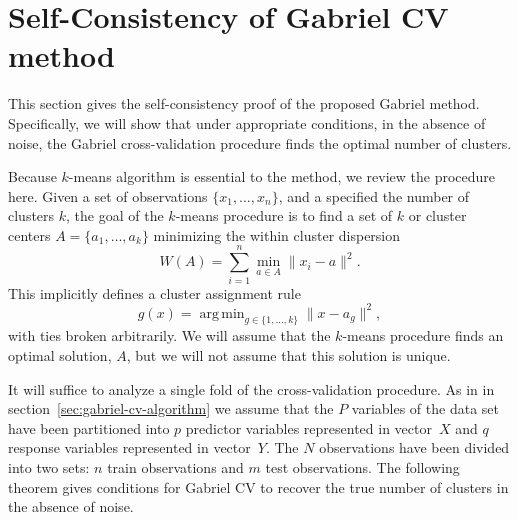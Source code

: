 \documentclass[11pt]{article}
\DeclareMathOperator*{\argmin}{arg\,min}
\begin{document}
\section{Self-Consistency of Gabriel CV method}


This section gives the self-consistency proof of the proposed Gabriel method.
Specifically, we will show that under appropriate conditions, in the absence
of noise, the Gabriel cross-validation procedure finds the optimal number of
clusters.


Because $k$-means algorithm is essential to the method, we review the
procedure here.  Given a set of observations $\{ x_1, \dotsc ,x_n \}$, and a
specified the number of clusters $k$, the goal of the $k$-means procedure is
to find a set of $k$ or cluster centers $A = \{ a_1, \dotsc, a_k \} $
minimizing the within cluster dispersion
\[
  W(A) = \sum_{i=1}^{n} \min_{a \in A} \|x_i - a\|^2.
\]
This implicitly defines a cluster assignment rule
\[
  g(x) = \argmin_{g \in \{1, \dotsc, k\}} \|x - a_g\|^2,
\]
with ties broken arbitrarily.  We will assume that the $k$-means procedure
finds an optimal solution, $A$, but we will not assume that this solution is
unique.


It will suffice to analyze a single fold of the cross-validation procedure.
As in in section~\ref{sec:gabriel-cv-algorithm} we assume that the $P$
variables of the data set have been partitioned into $p$ predictor variables
represented in vector~$X$ and $q$ response variables represented in
vector~$Y$.  The $N$ observations have been divided into two sets: $n$ train
observations and $m$ test observations.  The following theorem gives
conditions for Gabriel CV to recover the true number of clusters in the
absence of noise.
\end{document}
